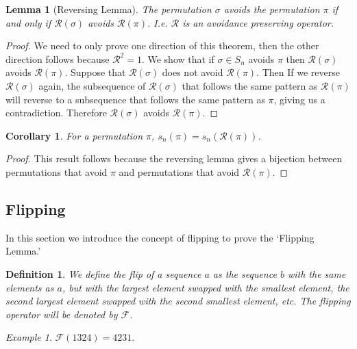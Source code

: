 \documentclass[11pt,letterpaper,twoside,english]{article}
\theoremstyle{theorem}
\newtheorem{corollary}[theorem]{Corollary}
\newtheorem{lemma}[theorem]{Lemma}
\newtheorem{definition}[theorem]{Definition}
\theoremstyle{remark}
\newtheorem{example}[theorem]{Example}
\begin{document}
\begin{lemma}[Reversing Lemma]
The permutation $\sigma$ avoids the permutation $\pi$ if and only if $\mathcal{R}(\sigma)$ avoids $\mathcal{R}(\pi)$. I.e. $\mathcal{R}$ is an avoidance preserving operator. 
\end{lemma}
\begin{proof}
We need to only prove one direction of this theorem, then the other direction follows because $\mathcal{R}^2=1$. We show that if ${\sigma}\in S_n$ avoids $\pi$ then $\mathcal{R}(\sigma)$ avoids $\mathcal{R}(\pi)$. Suppose that $\mathcal{R}(\sigma)$ does not avoid $\mathcal{R}(\pi)$. Then If we reverse $\mathcal{R}(\sigma)$ again, the subsequence of $\mathcal{R}(\sigma)$ that follows the same pattern as $\mathcal{R}(\pi)$ will reverse to a subsequence that follows the same pattern as $\pi$, giving us a contradiction. Therefore $\mathcal{R}(\sigma)$ avoids $\mathcal{R}(\pi)$. 

\end{proof}

\begin{corollary} 
For a permutation $\pi$, $s_n(\pi)=s_n(\mathcal{R}(\pi))$. 
\end{corollary}
\begin{proof}
This result follows because the reversing lemma gives a bijection between permutations that avoid $\pi$ and permutations that avoid $\mathcal{R}(\pi)$. 
\end{proof}

\subsection{Flipping}
In this section we introduce the concept of flipping to prove the `Flipping Lemma.'
\begin{definition}
We define the \emph{flip} of a sequence $a$ as the sequence $b$ with the same elements as $a$, but with the largest element swapped with the smallest element, the second largest element swapped with the second smallest element, etc.  The flipping operator will be denoted by $\mathcal{F}$.  
\end{definition}

\begin{example}
$\mathcal{F}(1324)=4231$.
\end{example}
\end{document}
